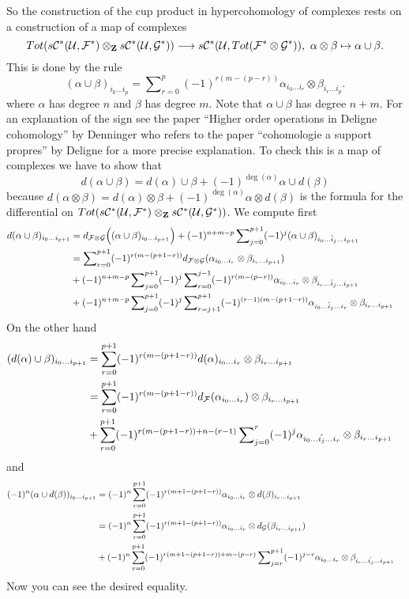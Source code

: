 \medskip\noindent
So the construction of the cup product in hypercohomology
of complexes rests on a construction of a map of complexes
$$
Tot(s{\mathcal C}^*({\mathcal U}, {\mathcal F}^*)
\otimes_{\bf Z}
s{\mathcal C}^*({\mathcal U}, {\mathcal G}^*))
\longrightarrow 
s{\mathcal C}^*({\mathcal U}, Tot({\mathcal F}^*\otimes {\mathcal G}^*)),\ 
\alpha \otimes \beta \mapsto \alpha \cup \beta.
$$
This is done by the rule
$$
(\alpha \cup \beta)_{i_0\ldots i_p}
=
\sum\nolimits_{r=0}^p
(-1)^{r(m-(p-r))}
\alpha_{i_0\ldots i_r} \otimes \beta_{i_r\ldots i_p}.
$$
where $\alpha$ has degree $n$ and $\beta$ has degree $m$.
Note that $\alpha \cup \beta$ has degree $n+m$.
For an explanation of the sign see the paper
``Higher order operations in Deligne cohomology'' by Denninger
who refers to the paper ``cohomologie a support propres'' by Deligne
for a more precise explanation.
To check this is a map of complexes we have to show that
$$
d(\alpha \cup \beta) = 
d(\alpha) \cup \beta +
(-1)^{\deg(\alpha)} \alpha \cup d(\beta)
$$
because $d(\alpha \otimes \beta) = d(\alpha)\otimes\beta
+ (-1)^{\deg(\alpha)} \alpha\otimes d(\beta)$ is the formula
for the differential on $Tot(s{\mathcal C}^*({\mathcal U}, {\mathcal F}^*)
\otimes_{\bf Z} s{\mathcal C}^*({\mathcal U}, {\mathcal G}^*))$. We compute
first
\begin{align*}
d(\alpha \cup \beta)_{i_0\ldots i_{p+1}}
& =
d_{{\mathcal F}\otimes {\mathcal G}}
\Big(
(\alpha \cup \beta)_{i_0\ldots i_{p+1}}
\Big)
+
(-1)^{n+m-p}
\sum\nolimits_{j=0}^{p+1}
(-1)^j
(\alpha \cup \beta)_{i_0\ldots\hat i_j\ldots i_{p+1}}
\cr
& =
\sum\nolimits_{r=0}^{p+1}
(-1)^{r(m-(p+1-r))}
d_{{\mathcal F}\otimes {\mathcal G}}
(
\alpha_{i_0\ldots i_r} \otimes \beta_{i_r\ldots i_{p+1}}
)
\cr
& +
(-1)^{n+m-p}
\sum\nolimits_{j=0}^{p+1}
(-1)^j
\sum\nolimits_{r=0}^{j-1}
(-1)^{r(m-(p-r))}
\alpha_{i_0\ldots i_r} \otimes \beta_{i_r\ldots\hat i_j\ldots i_{p+1}}
\cr
& +
(-1)^{n+m-p}
\sum\nolimits_{j=0}^{p+1}
(-1)^j
\sum\nolimits_{r=j+1}^{p+1}
(-1)^{(r-1)(m-(p+1-r))}
\alpha_{i_0\ldots\hat i_j\ldots i_r} \otimes \beta_{i_r\ldots i_{p+1}}
\end{align*}
On the other hand
\begin{align*}
(d(\alpha) \cup \beta)_{i_0\ldots i_{p+1}}
& =
\sum_{r=0}^{p+1}
(-1)^{r(m-(p+1-r))}
d(\alpha)_{i_0\ldots i_r} \otimes \beta_{i_r\ldots i_{p+1}}
\cr
& =
\sum_{r=0}^{p+1}
(-1)^{r(m-(p+1-r))}
d_{\mathcal F}(\alpha_{i_0\ldots i_r}) \otimes \beta_{i_r\ldots i_{p+1}}
\cr
& +
\sum_{r=0}^{p+1}
(-1)^{r(m-(p+1-r))+n-(r-1)}
\sum\nolimits_{j=0}^{r}
(-1)^j
\alpha_{i_0\ldots\hat{i_j}\ldots i_r} \otimes \beta_{i_r\ldots i_{p+1}}
\end{align*}
and
\begin{align*}
(-1)^n (\alpha \cup d(\beta))_{i_0\ldots i_{p+1}}
& =
(-1)^n
\sum_{r=0}^{p+1}
(-1)^{r(m+1-(p+1-r))}
\alpha_{i_0\ldots i_r} \otimes d(\beta)_{i_r\ldots i_{p+1}}
\cr
& =
(-1)^n
\sum_{r=0}^{p+1}
(-1)^{r(m+1-(p+1-r))}
\alpha_{i_0\ldots i_r} \otimes d_{\mathcal G}(\beta_{i_r\ldots i_{p+1}})
\cr
& +
(-1)^n
\sum_{r=0}^{p+1}
(-1)^{r(m+1-(p+1-r))+m-(p-r)}
\sum\nolimits_{j=r}^{p+1}
(-1)^{j-r}
\alpha_{i_0\ldots i_r} \otimes \beta_{i_r\ldots\hat{i_j}\ldots i_{p+1}}
\end{align*}
Now you can see the desired equality.

